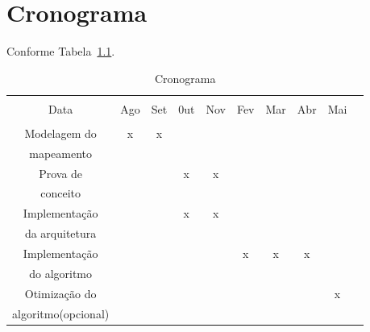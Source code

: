 \chapter{Cronograma}

Conforme Tabela~\ref{tab:crono}.
\begin{table}[Ht!]
   \begin{center}
     \begin{tabular}{|c|c|c|c|c|c|c|c|c|c|}
       \hline
                         &      &     &     &     &     &     &     &         \\
           Data          &  Ago & Set & 0ut & Nov & Fev & Mar & Abr & Mai      \\
                         &      &     &     &     &     &     &     &         \\
       \hline                                                                 
       Modelagem do      &   x  &  x  &     &     &     &     &     &         \\
       mapeamento        &      &     &     &     &     &     &     &         \\
       \hline                                                                 
       Prova de          &      &     &  x  &  x  &     &     &     &         \\
       conceito          &      &     &     &     &     &     &     &         \\
       \hline                                                                 
       Implementação     &      &     &  x  &  x  &     &     &     &         \\
       da arquitetura    &      &     &     &     &     &     &     &         \\
       \hline                                                                 
       Implementação     &      &     &     &     &  x  &  x  &  x  &         \\
       do algoritmo      &      &     &     &     &     &     &     &         \\
       \hline                                                                 
       Otimização do     &      &     &     &     &     &     &     &   x     \\
       algoritmo(opcional)&      &     &     &     &     &     &     &         \\
       \hline
     \end{tabular}
   \caption{Cronograma}
   \label{tab:crono}
   \end{center}
 \end{table}

